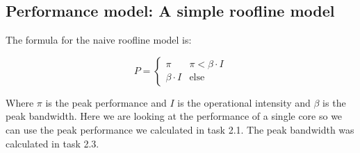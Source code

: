 \documentclass[unicode,11pt,a4paper,oneside,numbers=endperiod,openany]{scrartcl}
\begin{document}
\subsection{Performance model: A simple roofline model}

The formula for the naive roofline model is:

$$
P = \begin{cases}
    \pi & \pi < \beta \cdot I \\
    \beta \cdot I & \text{else}
\end{cases}
$$

Where $\pi$ is the peak performance and $I$ is the operational intensity and $\beta$ is the peak bandwidth.
Here we are looking at the performance of a single core so we can use the peak performance we calculated in task 2.1.
The peak bandwidth was calculated in task 2.3. 
\end{document}
